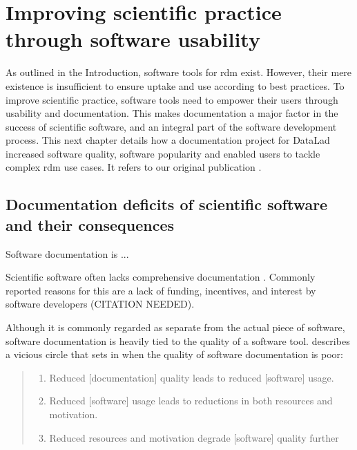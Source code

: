 

\chapter{Improving scientific practice through software usability}
\label{chap:k2}

As outlined in the Introduction, software tools for \gls{rdm} exist.
However, their mere existence is insufficient to ensure uptake and use according to best practices.
To improve scientific practice, software tools need to empower their users through usability and documentation.
This makes documentation a major factor in the success of scientific software, and an integral part of the software development process.
This next chapter details how a documentation project for DataLad increased software quality, software popularity and enabled users to tackle complex \gls{rdm} use cases.
It refers to our original publication \citet{wagner2020datalad}.

\section{Documentation deficits of scientific software and their consequences}

Software documentation is ...

Scientific software often lacks comprehensive documentation \citet{segal2007some}.
Commonly reported reasons for this are a lack of funding, incentives, and interest by software developers (CITATION NEEDED).

Although it is commonly regarded as separate from the actual piece of software, software documentation is heavily tied to the quality of a software tool.
\citet{Parnas2011} describes a vicious circle that sets in when the quality of software documentation is poor:

\begin{quote}
\begin{enumerate}
\item Reduced [documentation] quality leads to reduced [software] usage.
\item Reduced [software] usage leads to reductions in both resources and motivation.
\item Reduced resources and motivation degrade [software] quality further
\end{enumerate}
\end{quote}



